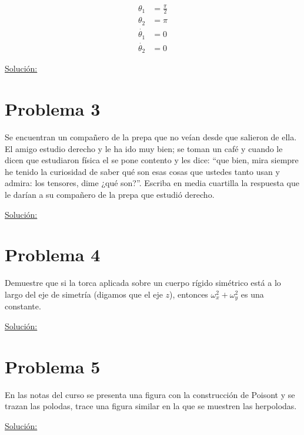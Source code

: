 \documentclass[a4paper,10pt]{article}
\numberwithin{equation}{section}
\begin{document}
\begin{align*}
 \theta_1 &= \frac{\pi}{2} \\
 \theta_2 &= \pi \\
 \dot{\theta_1} &= 0 \\
 \dot{\theta_2} &= 0 
\end{align*}

\vspace{.3cm}

\underline{Solución:} \vspace{.3cm}

\section{Problema 3}

Se encuentran un compañero de la prepa que no veían desde que salieron de ella. El 
amigo estudio derecho y le ha ido muy bien; se toman un café y cuando le dicen que 
estudiaron física el se pone contento y les dice: ``que bien, mira siempre he tenido
la curiosidad de saber qué son esas cosas que ustedes tanto usan y admira: los 
tensores, dime ¿qué son?''. Escriba en media cuartilla la respuesta que le darían 
a su compañero de la prepa que estudió derecho.

\vspace{.3cm}

\underline{Solución:} \vspace{.3cm}

\section{Problema 4}

Demuestre que si la torca aplicada sobre un cuerpo rígido simétrico está a lo largo 
del eje de simetría (digamos que el eje $z$), entonces $\omega_x^2 + \omega_y^2$ es 
una constante.

\vspace{.3cm}

\underline{Solución:} \vspace{.3cm}

\section{Problema 5}

En las notas del curso se presenta una figura con la construcción de Poisont y se 
trazan las polodas, trace una figura similar en la que se muestren las herpolodas.

\vspace{.3cm}

\underline{Solución:} \vspace{.3cm}
\end{document}
